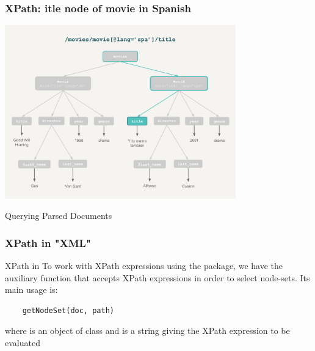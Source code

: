 \documentclass{beamer}\usepackage[]{graphicx}\usepackage[]{color}
\begin{document}
\begin{frame}[fragile]
\frametitle{XPath: itle node of movie in Spanish}

\begin{center}
\includegraphics[width=10cm]{images/xpath_ytmt.pdf}
\end{center}

\end{frame}


\begin{frame}
 \begin{center}
  {\Huge \textcolor{mandarina}{Querying Parsed Documents}}
 \end{center}
\end{frame}


\begin{frame}[fragile]
\frametitle{XPath in "XML"}

\begin{block}{XPath in }
To work with XPath expressions using the  package, we have the auxiliary function  that accepts XPath expressions in order to 
select node-sets. Its main usage is:
\begin{verbatim}
    getNodeSet(doc, path)
\end{verbatim}
\end{block}

where  is an object of class  and  is a string giving the XPath expression to be evaluated

\end{frame}

\end{document}
